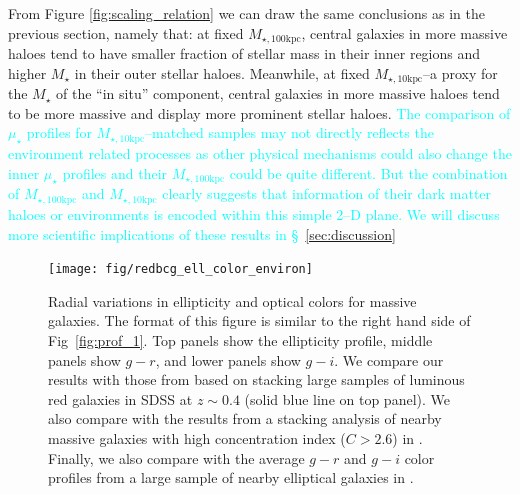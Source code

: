 \documentclass[a4paper,fleqn,usenatbib]{mnras}
\def\mstar{{$M_{\star}$}}
\def\minn{{$M_{\star,10\mathrm{kpc}}$}}
\def\mtot{{$M_{\star,100\mathrm{kpc}}$}}
\def\mden{{$\mu_{\star}$}}
\newcommand{\song}[1]{\textcolor{cyan}{#1}}
\begin{document}
    From Figure \ref{fig:scaling_relation} we can draw the same conclusions as in 
    the previous section, namely that: 
    at fixed \mtot{}, central galaxies in more massive haloes tend to have smaller 
    fraction of stellar mass in their inner regions and higher \mstar{} in their outer
    stellar haloes. 
    Meanwhile, at fixed \minn{}--a proxy for the \mstar{} of the ``in situ'' component,
    central galaxies in more massive haloes tend to be more massive and display more 
    prominent stellar haloes. 
    \song{
    The comparison of \mden{} profiles for \minn{}--matched samples may not directly
    reflects the environment related processes as other physical mechanisms could 
    also change the inner \mden{} profiles and their \mtot{} could be quite different. 
    But the combination of \mtot{} and \minn{} clearly suggests that information of
    their dark matter haloes or environments is encoded within this simple 2--D plane. 
    We will discuss more scientific implications of these results in 
    \S~\ref{sec:discussion}
    }
     

  \begin{figure}
      \centering 
      \texttt{[image: fig/redbcg\_ell\_color\_environ]}
      \caption{
          Radial variations in ellipticity and optical colors for massive galaxies. 
          The format of this figure is similar to the right hand side of 
          Fig~\ref{fig:prof_1}. 
          Top panels show the ellipticity profile, middle panels show $g-r$, and lower 
          panels show $g-i$. 
          We compare our results with those from \citet{Tal2011} based on stacking 
          large samples of luminous red galaxies in SDSS at $z{\sim} 0.4$ 
          (solid blue line on top panel). 
          We also compare with the results from a stacking analysis of nearby massive 
          galaxies with high concentration index ($C>2.6$) in 
          \citet[][blue dash lines on the top and middle panels]{DSouza2014}. 
          Finally, we also compare with the average $g-r$ and $g-i$ color profiles 
          from a large sample of nearby elliptical galaxies in \citet[][blue, solid 
          lines on the middle and bottom panels]{LaBarbera2010}.
          }
      \label{fig:ell_color}
  \end{figure}
\end{document}
